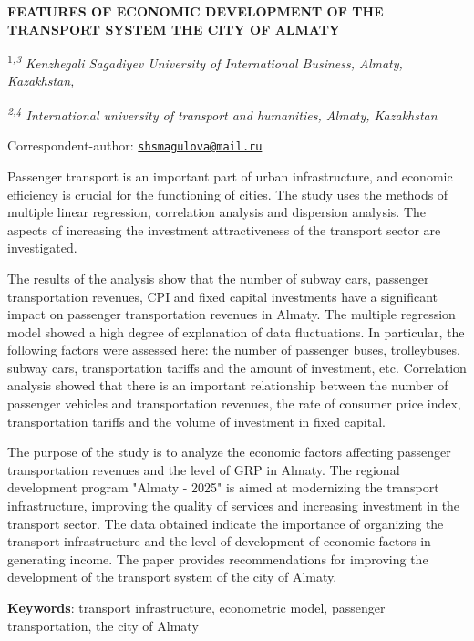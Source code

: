 
{\bfseries FEATURES OF ECONOMIC DEVELOPMENT OF THE TRANSPORT SYSTEM THE
CITY OF ALMATY}



\textsuperscript{1\emph{,3 }}\emph{Kenzhegali Sagadiyev University of
International Business, Almaty, Kazakhstan,}

\emph{\textsuperscript{2,4} International university of transport and
humanities, Almaty, Kazakhstan}

{\bfseries \textsuperscript{\envelope }}Correspondent-author:
\href{mailto:shsmagulova@mail.ru}{\nolinkurl{shsmagulova@mail.ru}}

Passenger transport is an important part of urban infrastructure, and
economic efficiency is crucial for the functioning of cities. The study
uses the methods of multiple linear regression, correlation analysis and
dispersion analysis. The aspects of increasing the investment
attractiveness of the transport sector are investigated.

The results of the analysis show that the number of subway cars,
passenger transportation revenues, CPI and fixed capital investments
have a significant impact on passenger transportation revenues in
Almaty. The multiple regression model showed a high degree of
explanation of data fluctuations. In particular, the following factors
were assessed here: the number of passenger buses, trolleybuses, subway
cars, transportation tariffs and the amount of investment, etc.
Correlation analysis showed that there is an important relationship
between the number of passenger vehicles and transportation revenues,
the rate of consumer price index, transportation tariffs and the volume
of investment in fixed capital.

The purpose of the study is to analyze the economic factors affecting
passenger transportation revenues and the level of GRP in Almaty. The
regional development program "Almaty - 2025" is aimed at modernizing the
transport infrastructure, improving the quality of services and
increasing investment in the transport sector. The data obtained
indicate the importance of organizing the transport infrastructure and
the level of development of economic factors in generating income. The
paper provides recommendations for improving the development of the
transport system of the city of Almaty.

{\bfseries Keywords}: transport infrastructure, econometric model,
passenger transportation, the city of Almaty

